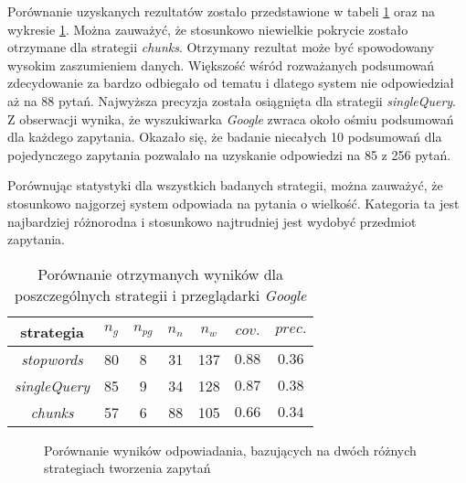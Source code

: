 Porównanie uzyskanych rezultatów zostało przedstawione w tabeli \ref{tab:porownanieStrat} oraz na wykresie \ref{fig:porownanie-strategie}. Można zauważyć, że stosunkowo niewielkie pokrycie zostało otrzymane dla strategii \textit{chunks}. Otrzymany rezultat może być spowodowany wysokim zaszumieniem danych. Większość wśród rozważanych podsumowań zdecydowanie za bardzo odbiegało od tematu i dlatego system nie odpowiedział aż na 88 pytań. Najwyższa precyzja została osiągnięta dla strategii \textit{singleQuery}. Z obserwacji wynika, że wyszukiwarka \textit{Google} zwraca około ośmiu podsumowań dla każdego zapytania. Okazało się, że badanie niecałych 10 podsumowań dla pojedynczego zapytania pozwalało na uzyskanie odpowiedzi na 85 z 256 pytań. 

Porównując statystyki dla wszystkich badanych strategii, można zauważyć, że stosunkowo najgorzej system odpowiada na pytania o wielkość. Kategoria ta jest najbardziej różnorodna i stosunkowo najtrudniej jest wydobyć przedmiot zapytania.


\begin{table}[h]
	\centering
	\begin{tabular}{|c|c|c|c|c|c|c| }
		\hline
		\textbf{strategia} & $n_g$ &$n_{pg}$&$n_n$&$n_w$&$cov.$&$prec.$  \\ \hline
		\textit{stopwords}&80&8&31&137&$\num{0.88}$&$\num{0.36}$ \\ \hline
		\textit{singleQuery}&85&9&34&128&$\num{0.87}$&$\num{0.38}$ \\ \hline
		\textit{chunks}&57&6&88&105&$\num{0.66}$&$\num{0.34}$ \\ \hline
	\end{tabular}
	\caption{Porównanie otrzymanych wyników dla poszczególnych strategii i przeglądarki \textit{Google}}
	
	\label{tab:porownanieStrat}
	
\end{table}

\begin{figure}
	
	\caption{Porównanie wyników odpowiadania, bazujących na dwóch różnych strategiach tworzenia zapytań} \label{fig:porownanie-strategie}
\end{figure}


